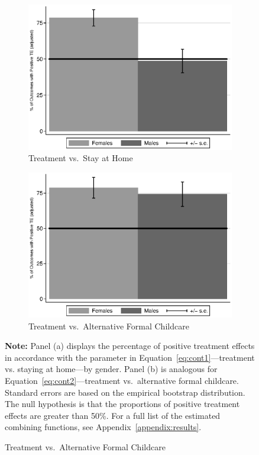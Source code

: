 \begin{figure}
\centering
\caption{Positively Impacted Outcomes, ABC/CARE Males and Females}\label{fig:ppositive}
\begin{subfigure}[h]{0.5\textwidth}
	\centering
	\caption{Treatment vs.\ Stay at Home} \label{fig:ppositivehome}
	\includegraphics[width=\textwidth]{output/epan_ipw_p0_all.eps}
\end{subfigure}%
\begin{subfigure}[h]{0.5\textwidth}
	\centering
	\caption{Treatment vs.\ Alternative Formal Childcare} \label{fig:ppositivealternative}
		\includegraphics[width=\textwidth]{output/epan_ipw_p1_all.eps}
\end{subfigure}
\footnotesize \justify
\textbf{Note:} Panel (a) displays the percentage of positive treatment effects in accordance with the parameter in Equation~\eqref{eq:cont1}---treatment vs. staying at home---by gender. Panel (b) is analogous for Equation~\eqref{eq:cont2}---treatment vs.\ alternative formal childcare. Standard errors are based on the empirical bootstrap distribution. The null hypothesis is that the proportions of positive treatment effects are greater than 50\%. For a full list of the estimated combining functions, see Appendix~\ref{appendix:results}. 
\end{figure}


